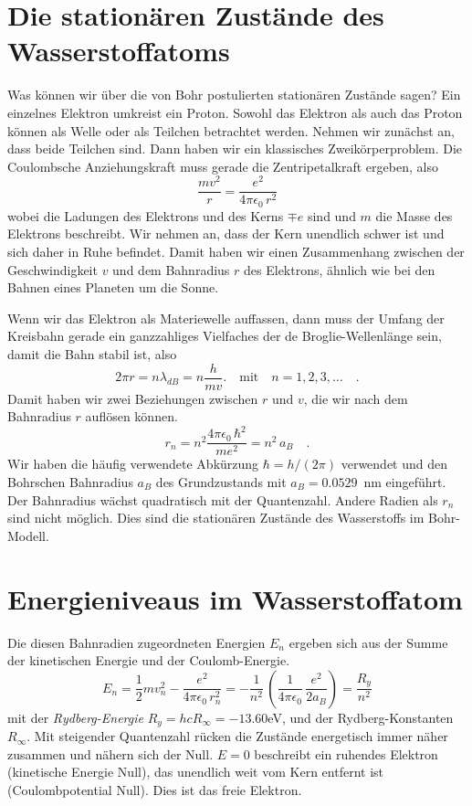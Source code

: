 \section{Die stationären Zustände des Wasserstoffatoms}

Was können wir über die von Bohr postulierten stationären Zustände sagen? Ein einzelnes Elektron umkreist ein Proton. Sowohl das Elektron als auch das Proton können als Welle oder als Teilchen betrachtet werden. Nehmen wir zunächst an, dass beide Teilchen sind. Dann haben wir ein klassisches Zweikörperproblem. Die Coulombsche Anziehungskraft muss gerade die Zentripetalkraft ergeben, also
\begin{equation}
    \frac{m v^2}{r} = \frac{e^2}{4 \pi \epsilon_0 \, r^2}
\end{equation}
wobei die Ladungen des Elektrons und des Kerns $\mp e$ sind und $m$ die Masse des Elektrons beschreibt. Wir nehmen an, dass der Kern unendlich schwer ist und sich daher in Ruhe befindet. Damit haben wir einen Zusammenhang zwischen der Geschwindigkeit $v$ und dem Bahnradius $r$ des Elektrons, ähnlich wie bei den Bahnen eines Planeten um die Sonne.

Wenn wir das Elektron als Materiewelle auffassen, dann muss der Umfang der Kreisbahn gerade ein ganzzahliges Vielfaches der de Broglie-Wellenlänge sein, damit die Bahn stabil ist, also
\begin{equation}
    2 \pi r = n \lambda_{dB} = n \frac{h}{m v}. \quad \text{mit} \quad n = 1, 2, 3, \dots \quad .
\end{equation}
Damit haben wir zwei Beziehungen zwischen $r$ und $v$, die wir nach dem Bahnradius $r$ auflösen können.
\begin{equation}
    r_n = n^2 \frac{4 \pi \epsilon_0 \, \hbar^2}{m e^2} = n^2 \, a_B \quad .
\end{equation}
Wir haben die häufig verwendete Abkürzung $\hbar = h / (2\pi)$ verwendet und den Bohrschen Bahnradius $a_B$ des Grundzustands mit $a_B = 0.0529$~nm eingeführt. Der Bahnradius wächst quadratisch mit der Quantenzahl. Andere Radien als $r_n$ sind nicht möglich. Dies sind die stationären Zustände des Wasserstoffs im Bohr-Modell.

\section{Energieniveaus im Wasserstoffatom}

Die diesen Bahnradien zugeordneten Energien $E_n$ ergeben sich aus der Summe der kinetischen Energie und der Coulomb-Energie. 
\begin{equation}
    E_n = \frac{1}{2} m v_n^2 - \frac{e^2}{4 \pi \epsilon_0 \, r_n^2}
    = - \frac{1}{n^2} \, \left( \frac{1}{4 \pi \epsilon_0}  \, \frac{e^2}{2 a_B} \right) 
    =  \frac{R_y}{n^2}  
\end{equation}
mit der \emph{Rydberg-Energie} $R_y = h c R_\infty =  - 13.60$eV, und der Rydberg-Konstanten $R_\infty$. Mit steigender Quantenzahl rücken die Zustände energetisch immer näher zusammen und nähern sich der Null. $E=0$ beschreibt ein ruhendes Elektron (kinetische Energie Null), das unendlich weit vom Kern entfernt ist (Coulombpotential Null). Dies ist das freie Elektron.

